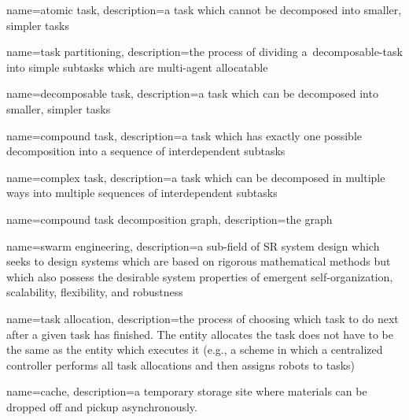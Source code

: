  {
  name={atomic task},
  description={a task which cannot be decomposed into smaller, simpler tasks}
}

 {
  name={task partitioning},
  description={the process of dividing a~\gls{decomposable-task} into simple
    subtasks which are multi-agent allocatable\cite{Ratnieks1999, Korsah2013}}
}

 {
  name={decomposable task},
  description={a task which can be decomposed into smaller, simpler tasks}
}

 {
  name={compound task},
  description={a task which has exactly one possible decomposition into
    a sequence of interdependent subtasks}
}

 {
  name={complex task},
  description={a task which can be decomposed in multiple ways into multiple
    sequences of interdependent subtasks
  }
}

 {
  name={compound task decomposition graph},
  description={the graph }
}

 {
  name={swarm engineering},
  description={a sub-field of SR system design which seeks to
    design systems which are based on rigorous mathematical methods but which
    also possess the desirable system properties of emergent self-organization,
    scalability, flexibility, and robustness
  }
}

 {
  name={task allocation},
  description={the process of choosing which task to do next after a given task
    has finished. The entity allocates the task does not have to be the same as
    the entity which executes it (e.g., a scheme in which a centralized
    controller performs all task allocations and then assigns robots to tasks)
  }
}

 {
  name={cache},
  description={a temporary storage site where materials can be dropped off and
    pickup asynchronously.
  }
}
